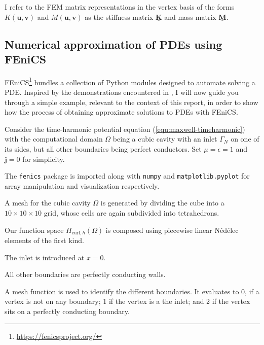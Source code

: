 \documentclass[11pt, a4paper]{article}
\begin{document}
I refer to the \acrshort{FEM} matrix representations in the vertex basis of the forms
$K(\mathbf{u}, \mathbf{v})$ and $M(\mathbf{u}, \mathbf{v})$ as the
stiffness matrix $\mathbf{\underline{K}}$ and mass matrix $\mathbf{\underline{M}}$.

\subsection{Numerical approximation of \acrshort{PDE}s using FEniCS}
\label{subsec:fem-demo}

FEniCS\footnote{\url{https://fenicsproject.org/}} bundles a collection of Python
modules designed to automate solving a \acrfull{PDE}.
Inspired by the demonstrations encountered in \cite{fenics}, I will now guide you
through a simple example, relevant to the context of this report, in order to
show how the process of obtaining
approximate solutions to \acrshort{PDE}s with FEniCS.

Consider the time-harmonic potential equation (\ref{equ:maxwell-timeharmonic})
with the computational domain $\Omega$ being a cubic cavity with an inlet $\Gamma_N$
on one of its sides, but all other boundaries being perfect conductors.
Set $\mu = \epsilon = 1$ and $\mathbf{j} = 0$ for simplicity.

The \texttt{fenics} package is imported along with \texttt{numpy} and
\texttt{matplotlib.pyplot} for array manipulation and visualization respectively.


A mesh for the cubic cavity $\Omega$ is generated by dividing the cube into a
$10\times10\times10$ grid, whose cells are again subdivided into tetrahedrons.


Our function space $H_{\textrm{curl},h}(\Omega)$ is composed using piecewise
linear Nédélec elements of the first kind.


The inlet is introduced at $x = 0$.


All other boundaries are perfectly conducting walls.


A mesh function is used to identify the different boundaries. It evaluates to
0, if a vertex is not on any boundary; 1 if the vertex is a the inlet; and 2 if
the vertex sits on a perfectly conducting boundary.

\end{document}
